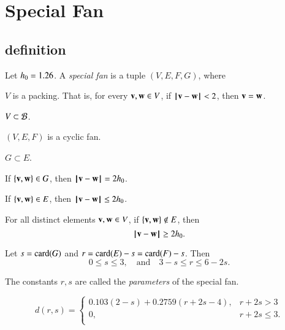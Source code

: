\section{Special Fan}\label{sec:weight}  






\subsection{definition}

\begin{definition}
Let $\hm = 1.26$.
A {\it special fan} is a tuple $(V,E,F,G)$, where
\begin{nomerate}
\item {} $V$ is a packing.  That is, for every $\v,\w\in V$, if $\norm{\v}{\w}<2$, then $\v=\w$.
\item {} $V\subset \BB$.
\item {} $(V,E,F)$ is a cyclic fan.
\item {} $G\subset E$.
\item {} If $\{\v,\w\}\in G$, then $\norm{\v}{\w}=2\hm$.
\item {} If $\{\v,\w\}\in E$, then $\norm{\v}{\w}\le 2\hm$.
\item {} For all distinct elements $\v,\w\in V$, if
$\{\v,\w\}\not\in E$, then $$\norm{\v}{\w}\ge 2\hm.$$
\item {} %
 Let      $s=\card(G)$ and $r=\card(E) - s = \card(F)-s$.  Then
$$0\le s \le 3,\quad\text{and}\quad3-s \le r \le 6 - 2s.$$
\end{nomerate}
The constants $r,s$ are called the {\it parameters} of the special fan.
\end{definition}


\begin{definition}[d]
$$d(r,s) = \begin{cases}
    0.103 (2-s) + 0.2759 (r+2s-4), & r + 2s > 3\\
    0, & r + 2s \le 3.\\
    \end{cases}$$
\end{definition}

